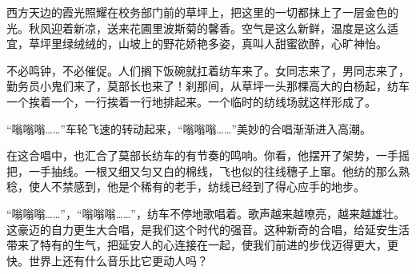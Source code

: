 \documentclass[12pt,UTF-8,openany]{ctexbook}
\begin{document}
\begin{large}
    西方天边的霞光照耀在校务部门前的草坪上，把这里的一切都抹上了一层金色的光。秋风迎着新凉，送来花圃里波斯菊的馨香。空气是这么新鲜，温度是这么适宜，草坪里绿绒绒的，山坡上的野花娇艳多姿，真叫人甜蜜欲醉，心旷神怡。
    
    不必鸣钟，不必催促。人们搁下饭碗就扛着纺车来了。女同志来了，男同志来了，勤务员小鬼们来了，莫部长也来了！刹那间，从草坪一头那棵高大的白杨起，纺车一个挨着一个，一行挨着一行地排起来。一个临时的纺线场就这样形成了。
    
    “嗡嗡嗡……”车轮飞速的转动起来，“嗡嗡嗡……”美妙的合唱渐渐进入高潮。
    
    在这合唱中，也汇合了莫部长纺车的有节奏的鸣响。你看，他摆开了架势，一手摇把，一手抽线。一根又细又匀又白的棉线，飞也似的往线穗子上窜。他纺的那么熟稔，使人不禁感到，他是个稀有的老手，纺线已经到了得心应手的地步。
    
    “嗡嗡嗡……”，“嗡嗡嗡……”，纺车不停地歌唱着。歌声越来越嘹亮，越来越雄壮。这豪迈的自力更生大合唱，是我们这个时代的强音。这种新奇的合唱，给延安生活带来了特有的生气，把延安人的心连接在一起，使我们前进的步伐迈得更大，更快。世界上还有什么音乐比它更动人吗？
    
\end{large}
\end{document}
